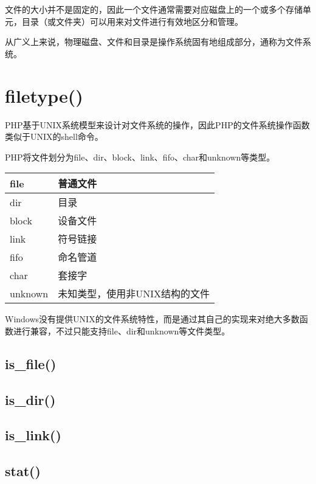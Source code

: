 文件的大小并不是固定的，因此一个文件通常需要对应磁盘上的一个或多个存储单元，目录（或文件夹）可以用来对文件进行有效地区分和管理。

从广义上来说，物理磁盘、文件和目录是操作系统固有地组成部分，通称为文件系统。

\section{filetype()}

PHP基于UNIX系统模型来设计对文件系统的操作，因此PHP的文件系统操作函数类似于UNIX的shell命令。




PHP将文件划分为file、dir、block、link、fifo、char和unknown等类型。

\begin{table}
\centering
\begin{tabular}{|l|l|}
\hline
file & 普通文件\\
\hline
dir & 目录\\
\hline
block & 设备文件\\
\hline
link & 符号链接\\
\hline
fifo & 命名管道\\
\hline
char & 套接字\\
\hline
unknown & 未知类型，使用非UNIX结构的文件\\
\hline
\end{tabular}
\end{table}


Windows没有提供UNIX的文件系统特性，而是通过其自己的实现来对绝大多数函数进行兼容，不过只能支持file、dir和unknown等文件类型。


\subsection{is\_file()}



\subsection{is\_dir()}



\subsection{is\_link()}


\subsection{stat()}



